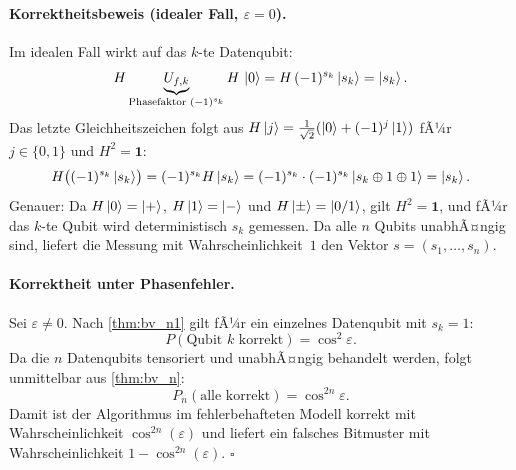 ﻿\documentclass[11pt,a4paper]{article}
\theoremstyle{definition}
\newcommand{\eps}{\varepsilon}
\begin{document}
\paragraph{Korrektheitsbeweis (idealer Fall, $\varepsilon=0$).}
Im idealen Fall wirkt auf das $k$-te Datenqubit:
\[
  H \underbrace{U_{f,k}}_{\text{Phasefaktor }(-1)^{s_k}} H\,\ket{0}
  = H\,(-1)^{s_k}\ket{s_k} = \ket{s_k}.
\]
Das letzte Gleichheitszeichen folgt aus $H\ket{j}=\tfrac{1}{\sqrt{2}}(\ket{0}+(-1)^j\ket{1})$
fÃ¼r $j\in\{0,1\}$ und $H^2=\mathbf{1}$:
\[
  H\bigl((-1)^{s_k}\ket{s_k}\bigr) = (-1)^{s_k}H\ket{s_k}
  = (-1)^{s_k}\cdot(-1)^{s_k}\ket{s_k\oplus 1\oplus 1} = \ket{s_k}.
\]
Genauer: Da $H\ket{0}=\ket{+}$, $H\ket{1}=\ket{-}$ und $H\ket{\pm}=\ket{0/1}$,
gilt $H^2=\mathbf{1}$, und fÃ¼r das $k$-te Qubit wird deterministisch $s_k$
gemessen.  Da alle $n$ Qubits unabhÃ¤ngig sind, liefert die Messung mit
Wahrscheinlichkeit~$1$ den Vektor $s=(s_1,\dots,s_n)$.

\paragraph{Korrektheit unter Phasenfehler.}
Sei $\eps\neq 0$.  Nach \cref{thm:bv_n1} gilt fÃ¼r ein einzelnes
Datenqubit mit $s_k=1$:
\[
  P(\text{Qubit }k\text{ korrekt}) = \cos^2\!\eps.
\]
Da die $n$ Datenqubits tensoriert und unabhÃ¤ngig behandelt werden, folgt
unmittelbar aus \cref{thm:bv_n}:
\[
  P_n(\text{alle korrekt}) = \cos^{2n}\!\eps.
\]
Damit ist der Algorithmus im fehlerbehafteten Modell korrekt mit
Wahrscheinlichkeit $\cos^{2n}(\eps)$ und liefert ein falsches Bitmuster
mit Wahrscheinlichkeit $1-\cos^{2n}(\eps)$.  $\square$
\end{document}
